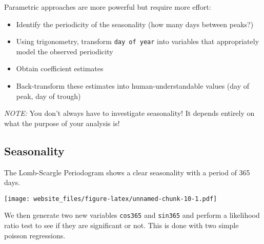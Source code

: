\documentclass[]{book}
\newenvironment{Shaded}{\begin{snugshade}}{\end{snugshade}}
\newcommand{\KeywordTok}[1]{\textcolor[rgb]{0.13,0.29,0.53}{\textbf{#1}}}
\newcommand{\DataTypeTok}[1]{\textcolor[rgb]{0.13,0.29,0.53}{#1}}
\newcommand{\DecValTok}[1]{\textcolor[rgb]{0.00,0.00,0.81}{#1}}
\newcommand{\StringTok}[1]{\textcolor[rgb]{0.31,0.60,0.02}{#1}}
\newcommand{\CommentTok}[1]{\textcolor[rgb]{0.56,0.35,0.01}{\textit{#1}}}
\newcommand{\OperatorTok}[1]{\textcolor[rgb]{0.81,0.36,0.00}{\textbf{#1}}}
\newcommand{\NormalTok}[1]{#1}
\providecommand{\tightlist}{%
  \setlength{\itemsep}{0pt}\setlength{\parskip}{0pt}}
\begin{document}
Parametric approaches are more powerful but require more effort:

\begin{itemize}
\tightlist
\item
  Identify the periodicity of the seasonality (how many days between
  peaks?)
\item
  Using trigonometry, transform \texttt{day\ of\ year} into variables
  that appropriately model the observed periodicity
\item
  Obtain coefficient estimates
\item
  Back-transform these estimates into human-understandable values (day
  of peak, day of trough)
\end{itemize}

\emph{NOTE:} You don't always have to investigate seasonality! It
depends entirely on what the purpose of your analysis is!

\subsection{Seasonality}\label{seasonality-1}

The Lomb-Scargle Periodogram shows a clear seasonality with a period of
365 days.

\begin{Shaded}
\end{Shaded}

\texttt{[image: website\_files/figure-latex/unnamed-chunk-10-1.pdf]}

We then generate two new variables \texttt{cos365} and \texttt{sin365}
and perform a likelihood ratio test to see if they are significant or
not. This is done with two simple poisson regressions.
\end{document}

